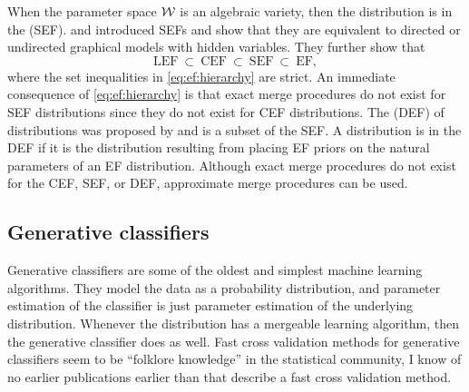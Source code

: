 \documentclass[thesis.tex]{subfiles}
\begin{document}
When the parameter space ${\mathcal W}$ is an algebraic variety,
then the distribution is in the  (SEF).
\cite{geiger1998graphical} and \citet{geiger2001stratified} introduced SEFs and show that they are equivalent to directed or undirected graphical models with hidden variables.
They further show that
\begin{equation}
    \label{eq:ef:hierarchy}
    \text{LEF}~ \subset ~\text{CEF}~ \subset ~\text{SEF}~\subset~\text{EF}
    ,
\end{equation}
where the set inequalities in \eqref{eq:ef:hierarchy} are strict.
An immediate consequence of \eqref{eq:ef:hierarchy} is that exact merge procedures do not exist for SEF distributions since they do not exist for CEF distributions.
The  (DEF) of distributions was proposed by \citet{ranganath2015deep} and is a subset of the SEF.
A distribution is in the DEF if it is the distribution resulting from placing EF priors on the natural parameters of an EF distribution.
Although exact merge procedures do not exist for the CEF, SEF, or DEF,
approximate merge procedures can be used.


\subsection{Generative classifiers}

Generative classifiers are some of the oldest and simplest machine learning algorithms.
They model the data as a probability distribution,
and parameter estimation of the classifier is just parameter estimation of the underlying distribution.
Whenever the distribution has a mergeable learning algorithm,
then the generative classifier does as well.
Fast cross validation methods for generative classifiers seem to be ``folklore knowledge'' in the statistical community,
I know of no earlier publications earlier than \cite{izbicki2013algebraic} that describe a fast cross validation method.
\end{document}
